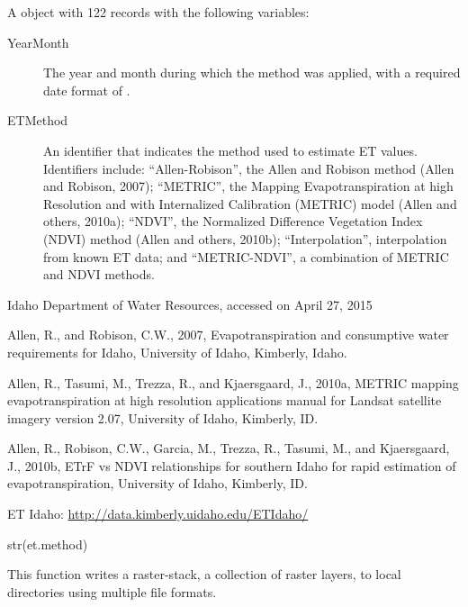 \documentclass[a4paper]{book}
\begin{document}
\begin{Format}
A  object with 122 records with the following variables:
\begin{description}

\item[YearMonth] The year and month during which the method was applied, with a required date format of .
\item[ETMethod] An identifier that indicates the method used to estimate ET values.
Identifiers include:
``Allen-Robison'', the Allen and Robison method (Allen and Robison, 2007);
``METRIC'', the Mapping Evapotranspiration at high Resolution and with Internalized Calibration (METRIC) model (Allen and others, 2010a);
``NDVI'', the Normalized Difference Vegetation Index (NDVI) method (Allen and others, 2010b);
``Interpolation'', interpolation from known ET data; and
``METRIC-NDVI'', a combination of METRIC and NDVI methods.


\end{description}

\end{Format}
%
\begin{Source}\relax
Idaho Department of Water Resources, accessed on April 27, 2015
\end{Source}
%
\begin{References}\relax
Allen, R., and Robison, C.W., 2007, Evapotranspiration and consumptive water requirements for Idaho, University of Idaho, Kimberly, Idaho.

Allen, R., Tasumi, M., Trezza, R., and Kjaersgaard, J., 2010a, METRIC mapping evapotranspiration at high resolution applications manual for Landsat satellite imagery version 2.07, University of Idaho, Kimberly, ID.

Allen, R., Robison, C.W., Garcia, M., Trezza, R., Tasumi, M., and Kjaersgaard, J., 2010b, ETrF vs NDVI relationships for southern Idaho for rapid estimation of evapotranspiration, University of Idaho, Kimberly, ID.

ET Idaho: \url{http://data.kimberly.uidaho.edu/ETIdaho/}
\end{References}
%
\begin{Examples}
\begin{ExampleCode}
str(et.method)
\end{ExampleCode}
\end{Examples}
%
\begin{Description}\relax
This function writes a raster-stack, a collection of raster layers, to local directories using multiple file formats.
\end{Description}
\end{document}
